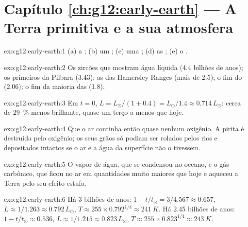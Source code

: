 \section*{Capítulo \ref{ch:g12:early-earth} --- A Terra primitiva e a sua atmosfera}

\begin{solution}{exo:g12:early-earth:1}
(a) a ; (b) um ; (c) uma ; (d) as ; (e) o .
\end{solution}

\begin{solution}{exo:g12:early-earth:2}
Os zircões que mostram água líquida (4.4 bilhões de anos); os primeiros
 da Pilbara (3.43); as  das
Hamersley Ranges (mais de 2.5); o fim do  (2.06); o
fim da maioria das  (1.8).
\end{solution}

\begin{solution}{exo:g12:early-earth:3}
Em $t = 0$, $L = L_\odot/(1 + 0.4) = L_\odot/1.4 \approx 0.714\,L_\odot$:
cerca de \qty{29}{\percent} menos brilhante, quase um terço a menos que hoje.
\end{solution}

\begin{solution}{exo:g12:early-earth:4}
Que o ar continha então quase nenhum oxigênio. A pirita é destruída pelo
oxigênio; os seus grãos só podiam ser rolados pelos rios e depositados
intactos se o ar e a água da superfície não o tivessem.
\end{solution}

\begin{solution}{exo:g12:early-earth:5}
O vapor de água, que se condensou no oceano, e o gás carbônico, que ficou no
ar em quantidades muito maiores que hoje e aqueceu a Terra pelo seu efeito
estufa.
\end{solution}

\begin{solution}{exo:g12:early-earth:6}
Há 3 bilhões de anos: $1 - t/t_\odot = 3/4.567 \approx 0.657$, $L \approx
1/1.263 \approx 0.792\,L_\odot$, $T \approx 255 \times 0.792^{1/4} \approx
\qty{241}{K}$. Há 2.45 bilhões de anos: $1 - t/t_\odot \approx 0.536$, $L
\approx 1/1.215 \approx 0.823\,L_\odot$, $T \approx 255 \times 0.823^{1/4}
\approx \qty{243}{K}$.
\end{solution}

